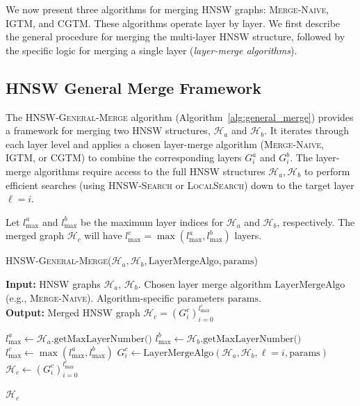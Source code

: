 \documentclass{article}
\begin{document}
We now present three algorithms for merging HNSW graphs: \textsc{Merge-Naive}, \textsc{IGTM}, and \textsc{CGTM}. These algorithms operate layer by layer. We first describe the general procedure for merging the multi-layer HNSW structure, followed by the specific logic for merging a single layer (\textit{layer-merge algorithms}).

\subsection{HNSW General Merge Framework}

The \textsc{HNSW-General-Merge} algorithm (Algorithm~\ref{alg:general_merge}) provides a framework for merging two HNSW structures, $\mathcal{H}_a$ and $\mathcal{H}_b$. It iterates through each layer level and applies a chosen layer-merge algorithm (\textsc{Merge-Naive}, \textsc{IGTM}, or \textsc{CGTM}) to combine the corresponding layers $G^a_i$ and $G^b_i$. The layer-merge algorithms require access to the full HNSW structures $\mathcal{H}_a, \mathcal{H}_b$ to perform efficient searches (using \textsc{HNSW-Search} or \textsc{LocalSearch}) down to the target layer $\ell=i$.

Let $l_{\max}^a$ and $l_{\max}^b$ be the maximum layer indices for $\mathcal{H}_a$ and $\mathcal{H}_b$, respectively. The merged graph $\mathcal{H}_c$ will have $l_{\max}^c = \max(l_{\max}^a, l_{\max}^b)$ layers.

\begin{algorithm}
\caption{\textsc{HNSW-General-Merge}($\mathcal{H}_a, \mathcal{H}_b, \text{LayerMergeAlgo}, \text{params}$)}\label{alg:general_merge}
\textbf{Input:} HNSW graphs $\mathcal{H}_a$, $\mathcal{H}_b $. Chosen layer merge algorithm $\text{LayerMergeAlgo}$ (e.g., \textsc{Merge-Naive}). Algorithm-specific parameters $\text{params}$. \\
\textbf{Output:} Merged HNSW graph $\mathcal{H}_c = (G^c_i)_{i=0}^{l_{\max}^c}$
\begin{algorithmic}[1]
\State $l_{\max}^a \gets \mathcal{H}_a.\text{getMaxLayerNumber()}$
\State $l_{\max}^b \gets \mathcal{H}_b.\text{getMaxLayerNumber()}$
\State $l_{\max}^c \gets \max(l_{\max}^a, l_{\max}^b)$
     
    \State $G^c_i \gets \text{LayerMergeAlgo}(\mathcal{H}_a, \mathcal{H}_b, \ell=i, \text{params})$ 
\EndFor
\State $\mathcal{H}_c \gets (G^c_i)_{i=0}^{l_{\max}^c}$ %

\State \Return $\mathcal{H}_c$
\end{algorithmic}
\end{algorithm}
\end{document}

